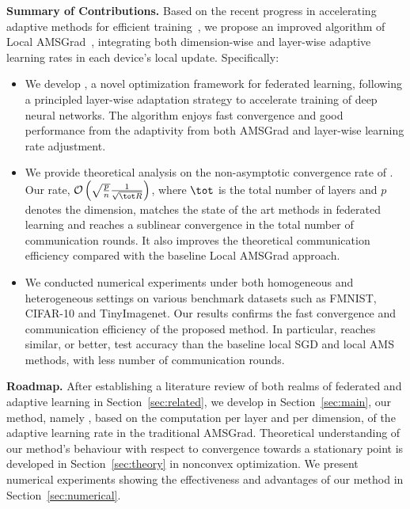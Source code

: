 \documentclass[nohyperref]{article}
\begin{document}
\vspace{0.1in}

\noindent\textbf{Summary of Contributions.} Based on the recent progress in accelerating adaptive methods for efficient training~\citep{you2019large}, we propose an improved algorithm of Local AMSGrad~\citep{chen2020toward}, integrating both dimension-wise and layer-wise adaptive learning rates in each device's local update.
Specifically:
\begin{itemize}
\item We develop  \algo, a novel optimization framework for federated learning, following a principled layer-wise adaptation strategy to accelerate training of deep neural networks. The algorithm enjoys fast convergence and good performance from the adaptivity from both AMSGrad and layer-wise learning rate adjustment.

\item We provide theoretical analysis on the non-asymptotic convergence rate of \algo. Our rate, $\mathcal{O}\left(\sqrt{\frac{ p}{ n}} \frac{1}{\sqrt{\tot R} } \right)$, where $\tot$ is the total number of layers and $p$ denotes the dimension, matches the state of the art methods in federated learning and reaches a sublinear convergence in the total number of communication rounds. It also improves the theoretical communication efficiency compared with the baseline Local AMSGrad approach.

\item We conducted numerical experiments under both homogeneous and heterogeneous settings on various benchmark datasets such as FMNIST, CIFAR-10 and TinyImagenet. Our results confirms the fast convergence and communication efficiency of the proposed method. In particular, \algo reaches similar, or better, test accuracy than the baseline local SGD and local AMS methods, with less number of communication rounds.
\end{itemize}

\vspace{0.1in}
\noindent\textbf{Roadmap.} After establishing a literature review of both realms of federated and adaptive learning in Section~\ref{sec:related}, we develop in Section~\ref{sec:main}, our method, namely \algo, based on the computation per layer and per dimension, of the adaptive learning rate in the traditional AMSGrad.
Theoretical understanding of our method's behaviour with respect to convergence towards a stationary point is developed in Section~\ref{sec:theory} in nonconvex optimization.
We present numerical experiments showing the effectiveness and advantages of our method in Section~\ref{sec:numerical}.
\end{document}
